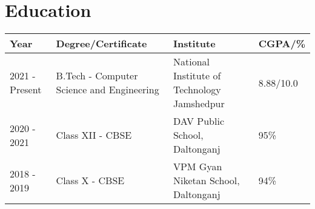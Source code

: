 \documentclass[letterpaper,11pt]{article}
\makeatletter
\newcommand{\resumeItem}[1]{
\item\large{
{#1 \vspace{-2pt}}
}
}
\newcommand{\resumeSubheading}[4]{
\vspace{-2pt}\item
\begin{tabular*}{1.0\textwidth}[t]{l@{\extracolsep{\fill}}r}
\textbf{#1} & \textbf{\normalsize #2} \\
\textit{\normalsize#3} & \textit{\normalsize #4} \\
\end{tabular*}\vspace{-7pt}
}
\newcommand{\resumeSubHeadingListStart}{\begin{itemize}[leftmargin=0.0in, label={}]}
\newcommand{\resumeSubHeadingListEnd}{\end{itemize}}
\newcommand{\resumeItemListStart}{\begin{itemize}}
\newcommand{\resumeItemListEnd}{\end{itemize}\vspace{-5pt}}
\makeatother
\begin{document}
\section{Education}
\vspace{-13pt}
\begin{table}[ht]
\centering
\begin{adjustbox}{width=1\textwidth}
\begingroup

\setlength{\tabcolsep}{6pt} %
\renewcommand{\arraystretch}{1.2} %
\begin{tabular}{|llll|}
\hline
\textbf{Year} & \textbf{Degree/Certificate} & \textbf{Institute}
& \textbf{CGPA/\%} \\
\hline
2021 - Present & B.Tech - Computer Science and Engineering & National Institute of
Technology Jamshedpur & 8.88/10.0 \\
2020 - 2021 & Class XII - CBSE & DAV Public School, Daltonganj &
95\% \\
2018 - 2019 & Class X - CBSE & VPM Gyan Niketan School, Daltonganj &
94\% \\
\hline
\end{tabular}
\endgroup
\end{adjustbox}
\end{table}
\vspace{-20pt}
\end{document}

